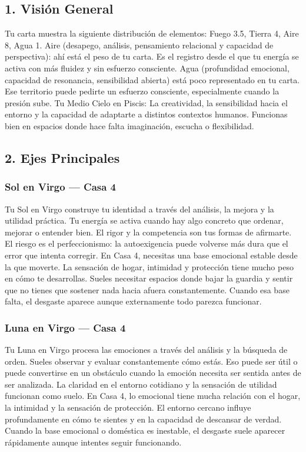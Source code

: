 \documentclass[11pt,a4paper]{article}\usepackage[utf8]{inputenc}
\begin{document}
\vspace{0.5cm}

\subsection{1. Visión General}

Tu carta muestra la siguiente distribución de elementos: Fuego 3.5, Tierra 4, Aire 8, Agua 1. Aire (desapego, análisis, pensamiento relacional y capacidad de perspectiva): ahí está el peso de tu carta. Es el registro desde el que tu energía se activa con más fluidez y sin esfuerzo consciente. Agua (profundidad emocional, capacidad de resonancia, sensibilidad abierta) está poco representado en tu carta. Ese territorio puede pedirte un esfuerzo consciente, especialmente cuando la presión sube.  Tu Medio Cielo en Piscis: La creatividad, la sensibilidad hacia el entorno y la capacidad de adaptarte a distintos contextos humanos. Funcionas bien en espacios donde hace falta imaginación, escucha o flexibilidad.

\subsection{2. Ejes Principales}

\subsubsection*{Sol en Virgo — Casa 4}
Tu Sol en Virgo construye tu identidad a través del análisis, la mejora y la utilidad práctica. Tu energía se activa cuando hay algo concreto que ordenar, mejorar o entender bien. El rigor y la competencia son tus formas de afirmarte. El riesgo es el perfeccionismo: la autoexigencia puede volverse más dura que el error que intenta corregir. En Casa 4, necesitas una base emocional estable desde la que moverte. La sensación de hogar, intimidad y protección tiene mucho peso en cómo te desarrollas. Sueles necesitar espacios donde bajar la guardia y sentir que no tienes que sostener nada hacia afuera constantemente. Cuando esa base falta, el desgaste aparece aunque externamente todo parezca funcionar.

\subsubsection*{Luna en Virgo — Casa 4}
Tu Luna en Virgo procesa las emociones a través del análisis y la búsqueda de orden. Sueles observar y evaluar constantemente cómo estás. Eso puede ser útil o puede convertirse en un obstáculo cuando la emoción necesita ser sentida antes de ser analizada. La claridad en el entorno cotidiano y la sensación de utilidad funcionan como suelo. En Casa 4, lo emocional tiene mucha relación con el hogar, la intimidad y la sensación de protección. El entorno cercano influye profundamente en cómo te sientes y en la capacidad de descansar de verdad. Cuando la base emocional o doméstica es inestable, el desgaste suele aparecer rápidamente aunque intentes seguir funcionando.
\end{document}
